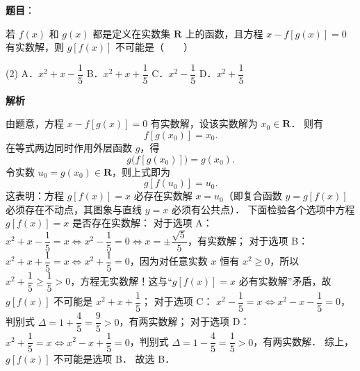 \begin{answer}

\textbf{题目}：

若 $f(x)$ 和 $g(x)$ 都是定义在实数集 $\mathbf{R}$ 上的函数，且方程 $x - f[g(x)] = 0$ 有实数解，则 $g[f(x)]$ 不可能是\mbox{（　　）}

\begin{gkopts}(2)
\task A．$x^2 + x - \dfrac{1}{5}$
\task B．$x^2 + x + \dfrac{1}{5}$
\task C．$x^2 - \dfrac{1}{5}$
\task D．$x^2 + \dfrac{1}{5}$
\end{gkopts}

\textbf{解析}

由题意，方程 $x - f[g(x)] = 0$ 有实数解，设该实数解为 $x_0 \in \mathbf{R}$．
则有
\nopagebreak[4]
\[
f[g(x_0)] = x_0.
\]
在等式两边同时作用外层函数 $g$，得
\nopagebreak[4]
\[
g\big(f[g(x_0)]\big) = g(x_0).
\]
令实数 $u_0 = g(x_0) \in \mathbf{R}$，则上式即为
\nopagebreak[4]
\[
g[f(u_0)] = u_0.
\]
这表明：方程 $g[f(x)] = x$ 必存在实数解 $x = u_0$（即复合函数 $y = g[f(x)]$ 必须存在不动点，其图象与直线 $y = x$ 必须有公共点）．
下面检验各个选项中方程 $g[f(x)] = x$ 是否存在实数解：
对于选项 A：
$x^2 + x - \dfrac{1}{5} = x \iff x^2 - \dfrac{1}{5} = 0 \iff x = \pm\dfrac{\sqrt{5}}{5}$，有实数解；
对于选项 B：
$x^2 + x + \dfrac{1}{5} = x \iff x^2 + \dfrac{1}{5} = 0$，因为对任意实数 $x$ 恒有 $x^2 \geqslant 0$，所以 $x^2 + \dfrac{1}{5} \geqslant \dfrac{1}{5} > 0$，方程无实数解！这与“$g[f(x)] = x$ 必有实数解”矛盾，故 $g[f(x)]$ 不可能是 $x^2 + x + \dfrac{1}{5}$；
对于选项 C：
$x^2 - \dfrac{1}{5} = x \iff x^2 - x - \dfrac{1}{5} = 0$，判别式 $\Delta = 1 + \dfrac{4}{5} = \dfrac{9}{5} > 0$，有两实数解；
对于选项 D：
$x^2 + \dfrac{1}{5} = x \iff x^2 - x + \dfrac{1}{5} = 0$，判别式 $\Delta = 1 - \dfrac{4}{5} = \dfrac{1}{5} > 0$，有两实数解．
综上，$g[f(x)]$ 不可能是选项 B．
故选 B．


\end{answer}
